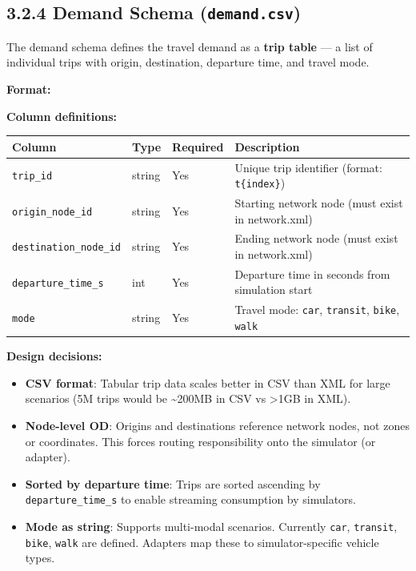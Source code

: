 \subsection{\texorpdfstring{3.2.4 Demand Schema
(\texttt{demand.csv})}{3.2.4 Demand Schema (demand.csv)}}\label{324-demand-schema-demandcsv}

The demand schema defines the travel demand as a \textbf{trip table} ---
a list of individual trips with origin, destination, departure time, and
travel mode.

\textbf{Format:}

\begin{Shaded}
\begin{Highlighting}[]
\end{Highlighting}
\end{Shaded}

\textbf{Column definitions:}

\begin{longtable}[]{@{}llll@{}}
\toprule\noalign{}
Column & Type & Required & Description \\
\midrule\noalign{}
\endhead
\bottomrule\noalign{}
\endlastfoot
\texttt{trip\_id} & string & Yes & Unique trip identifier (format:
\texttt{t\{index\}}) \\
\texttt{origin\_node\_id} & string & Yes & Starting network node (must
exist in network.xml) \\
\texttt{destination\_node\_id} & string & Yes & Ending network node
(must exist in network.xml) \\
\texttt{departure\_time\_s} & int & Yes & Departure time in seconds from
simulation start \\
\texttt{mode} & string & Yes & Travel mode: \texttt{car},
\texttt{transit}, \texttt{bike}, \texttt{walk} \\
\end{longtable}

\textbf{Design decisions:}

\begin{itemize}
\tightlist
\item
  \textbf{CSV format}: Tabular trip data scales better in CSV than XML
  for large scenarios (5M trips would be \textasciitilde200MB in CSV vs
  \textgreater1GB in XML).
\item
  \textbf{Node-level OD}: Origins and destinations reference network
  nodes, not zones or coordinates. This forces routing responsibility
  onto the simulator (or adapter).
\item
  \textbf{Sorted by departure time}: Trips are sorted ascending by
  \texttt{departure\_time\_s} to enable streaming consumption by
  simulators.
\item
  \textbf{Mode as string}: Supports multi-modal scenarios. Currently
  \texttt{car}, \texttt{transit}, \texttt{bike}, \texttt{walk} are
  defined. Adapters map these to simulator-specific vehicle types.
\end{itemize}

